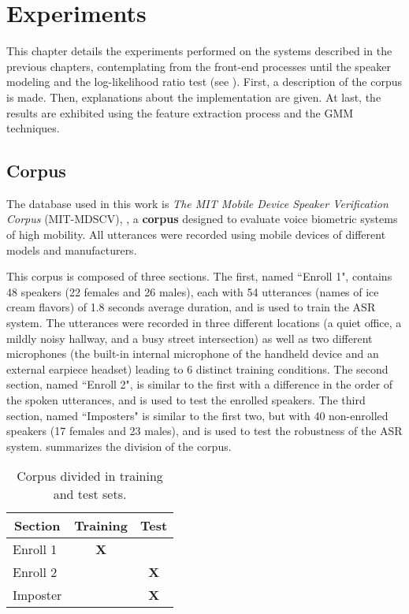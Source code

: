 \chapter{Experiments}
\label{ch:experiments}

This chapter details the experiments performed on the systems described in the previous chapters, contemplating from the front-end processes until the speaker modeling and the log-likelihood ratio test (see ). First, a description of the corpus is made. Then, explanations about the implementation are given. At last, the results are exhibited using the feature extraction process and the GMM techniques.

\section{Corpus}
\label{sec:corpus}

The database used in this work is \emph{The MIT Mobile Device Speaker Verification Corpus} (MIT-MDSCV), , a \textbf{corpus} designed to evaluate voice biometric systems of high mobility. All utterances were recorded using mobile devices of different models and manufacturers.

This corpus is composed of three sections. The first, named ``Enroll 1", contains 48 speakers (22 females and 26 males), each with 54 utterances (names of ice cream flavors) of 1.8 seconds average duration, and is used to train the ASR system. The utterances were recorded in three different locations (a quiet office, a mildly noisy hallway, and a busy street intersection) as well as two different microphones (the built-in internal microphone of the handheld device and an external earpiece headset) leading to 6 distinct training conditions. The second section, named ``Enroll 2", is similar to the first with a difference in the order of the spoken utterances, and is used to test the enrolled speakers. The third section, named ``Imposters" is similar to the first two, but with 40 non-enrolled speakers (17 females and 23 males), and is used to test the robustness of the ASR system.  summarizes the division of the corpus.

\begin{table}[h]
    \centering
    \begin{tabular}{|l|c|c|}
    \hline
    \multicolumn{1}{|c|}{{\bf Section}} & {\bf Training} & {\bf Test} \\ \hline
    Enroll 1                            & {\bf X}        & {\bf }     \\ \hline
    Enroll 2                            & {\bf }         & {\bf X}    \\ \hline
    Imposter                            & {\bf }         & {\bf X}    \\ \hline
    \end{tabular}
    \caption{Corpus divided in training and test sets.}
    \label{tab:corpus-division}
\end{table}

